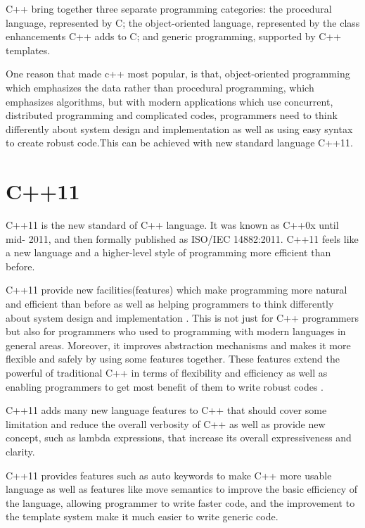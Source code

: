 \documentclass[11pt]{report}
\begin{document}
C++ bring together three separate programming categories: the procedural language, represented by C; the object-oriented language, represented by the class enhancements C++ adds to C; and generic programming, supported by C++ templates\cite{Prata:2012:Cpp}.

One reason that made c++ most popular, is that, object-oriented programming which emphasizes the data rather than procedural programming, which emphasizes algorithms, but with modern applications which use concurrent, distributed programming and complicated codes, programmers need to think differently about system design and implementation as well as using easy syntax  to create robust code.This can be achieved with new standard language C++11\cite{Stroustrup:2012:Cpp11}.

\section{C++11}
\label{section: C++11}
C++11 is the new standard of C++ language. It was known as C++0x until mid- 2011, and then formally published as ISO/IEC 14882:2011. C++11 feels like a new language and a higher-level style of programming more efficient than before\cite{ISO:2011:Cpplanguage}. 

C++11 provide new facilities(features) which make programming more natural and efficient than before as well as helping programmers to think differently about system design and implementation \cite{Stroustrup:2012:Cpp11}. This is not just for C++ programmers but also for programmers who used to programming with modern languages in general areas. Moreover, it improves abstraction mechanisms and makes it more flexible and safely by using some features together. These features extend the powerful of traditional C++ in terms of flexibility and efficiency as well as enabling programmers to get most benefit of them to write robust codes \cite{ISO:2011:Cpplanguage}.

C++11 adds many new language features to C++ that should cover some limitation and reduce the overall verbosity of C++ as well as provide new concept, such as lambda expressions, that increase its overall expressiveness and clarity.

C++11 provides features such as auto keywords to make C++ more usable language as well as features like move semantics to improve the basic efficiency of the language, allowing programmer to write faster code, and the improvement to the template system make it much easier to write generic code\cite{Stroustrup:2005:Cpp}.
\end{document}
